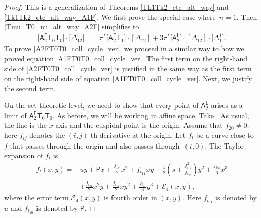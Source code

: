 \documentclass[pdftex]{sigma}
\numberwithin{equation}{section}
\begin{document}
\begin{proof}
This is a generalization of Theorems \ref{Tk1Tk2_etc_alt_way} and \ref{Tk1Tk2_etc_alt_way_A1F}.
We first prove
the special case where~${n = 1}$.
Then \eqref{Tmu_T0_nu_alt_way_A2F} simplifies to
\begin{align}
\bigl[\mathsf{A}_2^{\mathsf{F}} \mathsf{T}_{0}\mathsf{T}_0\bigr] \cdot \bigl[\Delta_{12}^{\mathsf{L}}\bigr] &  =
\pi^*\bigl[\mathsf{A}_2^{\mathsf{F}} \mathsf{T}_{1}\bigr] \cdot [\Delta_{12}] +
3 \pi^*\bigl[\mathsf{A}_2^{\mathsf{L}}\bigr]\cdot [\Delta_{12}]\cdot \bigl[\Delta_{1}^1\bigr].
\label{A2FT0T0_coll_cycle_ver}
\end{align}
To prove \eqref{A2FT0T0_coll_cycle_ver},
we proceed in a similar way to how we proved
equation \eqref{A1FT0T0_coll_cycle_ver}.
The first term on the right-hand side of
\eqref{A2FT0T0_coll_cycle_ver} is justified in the same way as the first term on the
right-hand side of equation \eqref{A1FT0T0_coll_cycle_ver}. Next, we justify the
second term.

On the set-theoretic level, we need to show that every
point of $\mathsf{A}_2^{\mathsf{L}}$ arises as a limit of $\mathsf{A}_2^{\mathsf{F}}
\mathsf{T}_0 \mathsf{T}_0$. As before, we will be working in affine space. Take . As usual, the line is the $x$-axis and the cuspidal point is the
origin. Assume that $f_{20} \neq 0$; here $f_{ij}$ denotes the $(i, j)$-th derivative at
the origin. Let $f_t$ be a curve close to $f$ that passes through the origin and also passes through~${(t, 0)}$.
The Taylor expansion of $f_t$ is
\begin{align*}
f_{t}(x, y) ={}& uy + \mathsf{P} x + \frac{f_{t_{20}}}{2} x^2 + f_{t_{11}} xy +
\frac{1}{2}\left(s + \frac{f_{t_{11}}^2}{f_{t_{20}}} \right) y ^2 +
\frac{f_{t_{30}}}{6} x^3
\\
&+\frac{f_{t_{21}}}{2} x^2 y + \frac{f_{t_{12}}}{2} x y^2 + \frac{f_{t_{03}}}{6} y^3 +
\mathcal{E}_4(x, y),
\end{align*}
where the error term $\mathcal{E}_4(x, y)$ is fourth order in $(x, y)$. Here
$f_{t_{01}}$ is denoted by $u$ and $f_{t_{10}}$ is denoted by $\mathsf{P}$.


\end{proof}
\end{document}
